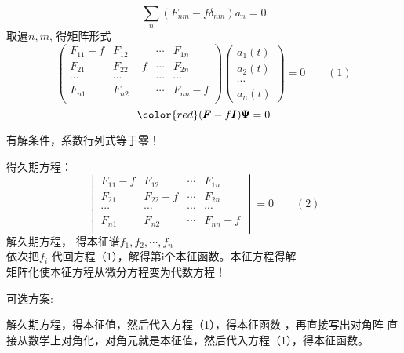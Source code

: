\begin{frame} 
    $$ \sum_n (F_{nm} -f \delta_{nm})a_n=0 $$
    取遍$n,m$, 得矩阵形式\\            
    $$\begin{pmatrix}
        F_{11}-f & F_{12} & \cdots & F_{1n} \\
        F_{21} & F_{22}-f & \cdots & F_{2n} \\
        \cdots & \cdots &  \cdots& \cdots\\
         F_{n1} & F_{n2} & \cdots & F_{nn}-f \\
     \end{pmatrix}
     \begin{pmatrix}
         a_1(t)\\
         a_2(t)\\
         \cdots \\
         a_n(t)
     \end{pmatrix}
     =0 \qquad (1)$$
     $$ \color{red} (\pmb F -f \pmb I) \pmb \Psi =0 $$

    有解条件，系数行列式等于零！
\end{frame}

\begin{frame} 
    得久期方程：
    $$\begin{vmatrix}
        F_{11}-f & F_{12} & \cdots & F_{1n} \\
        F_{21} & F_{22}-f & \cdots & F_{2n} \\
        \cdots & \cdots &  \cdots& \cdots\\
         F_{n1} & F_{n2} & \cdots & F_{nn}-f \\
     \end{vmatrix} 
     =0 \qquad (2) $$
     解久期方程， 得本征谱{$f_1,f_2,\cdots, f_n $}\\
     依次把$f_i$ 代回方程（1），解得第i个本征函数。本征方程得解\\
     矩阵化使本征方程从微分方程变为代数方程！
\end{frame}

\begin{frame} 
    可选方案:
    \begin{itemize}
        \done 解久期方程，得本征值，然后代入方程（1），得本征函数 ，再直接写出对角阵 
        \todo 直接从数学上对角化，对角元就是本征值，然后代入方程（1），得本征函数。
     \end{itemize}
\end{frame}

